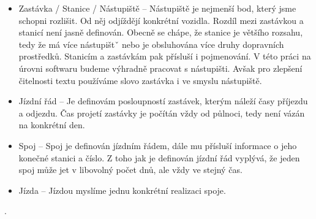 \begin{itemize}

	\item Zastávka / Stanice / Nástupiště -- Nástupiště je nejmenší bod, který jsme schopni rozlišit. Od něj odjíždějí konkrétní vozidla. Rozdíl mezi zastávkou a stanicí není jasně definován. Obecně se chápe, že stanice je většího rozsahu, tedy že má více nástupištˇ nebo je obsluhována více druhy dopravních prostředků. Stanicím a zastávkám pak přísluší i pojmenování. V této práci na úrovni softwaru budeme výhradně pracovat s nástupišti. Avšak pro zlepšení čitelnosti textu používáme slovo zastávka i ve smyslu nástupiště.

	\item Jízdní řád -- Je definovám posloupností zastávek, kterým náleží časy příjezdu a odjezdu. Čas projetí zastávky je počítán vždy od půlnoci, tedy není vázán na konkrétní den.

	\item Spoj -- Spoj je definován jízdním řádem, dále mu přísluší informace o jeho konečné stanici a číslo. Z toho jak je definován jízdní řád vyplývá, že jeden spoj může jet v libovolný počet dnů, ale vždy ve stejný čas.

	\item Jízda -- Jízdou myslíme jednu konkrétní realizaci spoje.

\end{itemize}.
